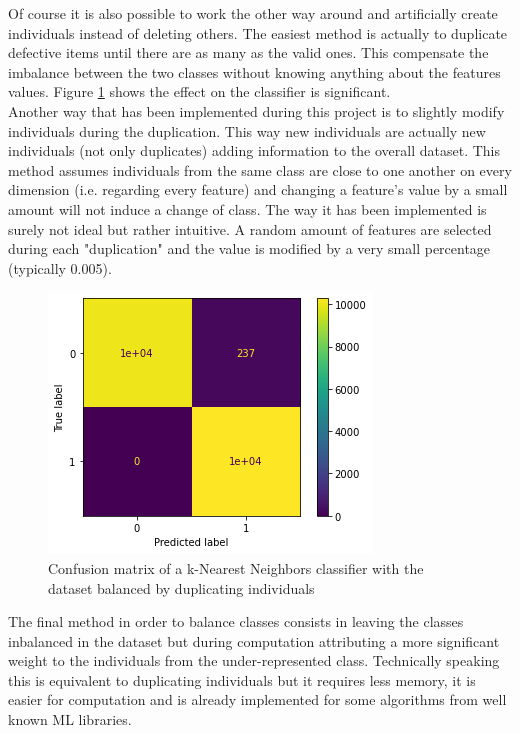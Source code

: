 Of course it is also possible to work the other way around and artificially create individuals instead of deleting others. The easiest method is actually to duplicate defective items until there are as many as the valid ones. This compensate the imbalance between the two classes without knowing anything about the features values. Figure \ref{data_preparation_3} shows the effect on the classifier is significant.\\
Another way that has been implemented during this project is to slightly modify individuals during the duplication. This way new individuals are actually new individuals (not only duplicates) adding information to the overall dataset. This method assumes individuals from the same class are close to one another on every dimension (i.e. regarding every feature) and changing a feature's value by a small amount will not induce a change of class. The way it has been implemented is surely not ideal but rather intuitive. A random amount of features are selected during each "duplication" and the value is modified by a very small percentage (typically 0.005).\\

\begin{figure}
    \center
    \includegraphics[scale=.5]{img/data_preparation_3.png}
    \caption{Confusion matrix of a k-Nearest Neighbors classifier with the dataset balanced by duplicating individuals}
    \label{data_preparation_3}
\end{figure}

The final method in order to balance classes consists in leaving the classes inbalanced in the dataset but during computation attributing a more significant weight to the individuals from the under-represented class. Technically speaking this is equivalent to duplicating individuals but it requires less memory, it is easier for computation and is already implemented for some algorithms from well known ML libraries.
